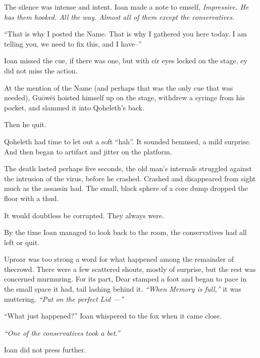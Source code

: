 The silence was intense and intent. Ioan made a note to emself, \emph{Impressive. He has them hooked. All the way. Almost all of them except the conservatives.}

``That is why I posted the Name. That is why I gathered you here today. I am telling you, we need to fix this, and I have--''

Ioan missed the cue, if there was one, but with eir eyes locked on the stage, ey did not miss the action.

At the mention of the Name (and perhaps that was the only cue that was needed), Guōwēi hoisted himself up on the stage, withdrew a syringe from his pocket, and slammed it into Qoheleth's back.

Then he quit.

Qoheleth had time to let out a soft ``hah''. It sounded bemused, a mild surprise. And then began to artifact and jitter on the platform.

The death lasted perhaps five seconds, the old man's internals struggled against the intrusion of the virus, before he crashed. Crashed and disappeared from sight much as the assassin had. The small, black sphere of a core dump dropped the floor with a thud.

It would doubtless be corrupted. They always were.

By the time Ioan managed to look back to the room, the conservatives had all left or quit.

Uproar was too strong a word for what happened among the remainder of thecrowd. There were a few scattered shouts, mostly of surprise, but the rest was concerned murmuring. For its part, Dear stamped a foot and began to pace in the small space it had, tail lashing behind it. \emph{``When Memory is full,''} it was muttering. \emph{``Put on the perfect Lid —''}

``What just happened?'' Ioan whispered to the fox when it came close.

\emph{``One of the conservatives took a bet.''}

Ioan did not press further.
